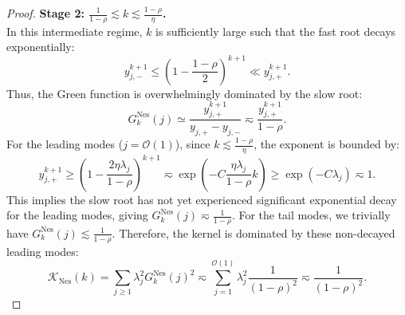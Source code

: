 \begin{proof}
\textbf{Stage 2: $\frac{1}{1-\rho} \lesssim k \lesssim \frac{1-\rho}{\eta}$.} \\
In this intermediate regime, $k$ is sufficiently large such that the fast root decays exponentially:
\[
    y_{j,-}^{k+1} \le \left(1-\frac{1-\rho}{2}\right)^{k+1} \ll y_{j,+}^{k+1}.
\]
Thus, the Green function is overwhelmingly dominated by the slow root:
\[
    G_k^{\mathrm{Nes}}(j) \simeq \frac{y_{j,+}^{k+1}}{y_{j,+}-y_{j,-}} \eqsim \frac{y_{j,+}^{k+1}}{1-\rho}.
\]
For the leading modes ($j = \mathcal{O}(1)$), since $k \lesssim \frac{1-\rho}{\eta}$, the exponent is bounded by:
\[
    y_{j,+}^{k+1} \ge \left(1 - \frac{2\eta\lambda_j}{1-\rho}\right)^{k+1} \eqsim \exp\left(-C \frac{\eta\lambda_j}{1-\rho}k\right) \ge \exp(-C \lambda_j) \eqsim 1.
\]
This implies the slow root has not yet experienced significant exponential decay for the leading modes, giving $G_k^{\mathrm{Nes}}(j) \eqsim \frac{1}{1-\rho}$. For the tail modes, we trivially have $G_k^{\mathrm{Nes}}(j) \lesssim \frac{1}{1-\rho}$. Therefore, the kernel is dominated by these non-decayed leading modes:
\[
    \mathcal K_{\mathrm{Nes}}(k) = \sum_{j\ge1}\lambda_j^2 G_k^{\mathrm{Nes}}(j)^2 \eqsim \sum_{j=1}^{\mathcal{O}(1)}\lambda_j^2 \frac{1}{(1-\rho)^2} \eqsim \frac{1}{(1-\rho)^2}.
\]


\end{proof}
